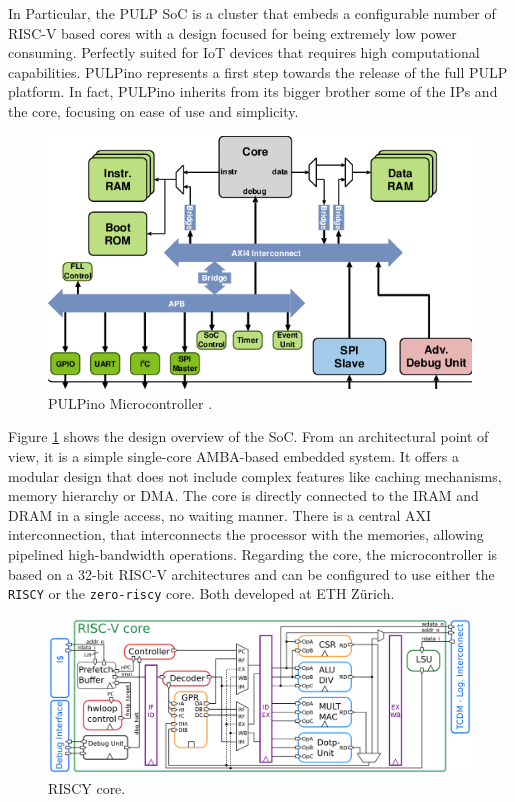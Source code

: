In Particular, the PULP SoC is a cluster that embeds a configurable number of RISC-V based cores with a design focused for being extremely low power consuming. Perfectly suited for IoT devices that requires high computational capabilities. PULPino represents a first step towards the release of the full PULP platform. In fact, PULPino inherits from its bigger brother some of the IPs and the core, focusing on ease of use and simplicity.

\begin{figure}[h!]
\centering
\vspace{0.5cm}
\includegraphics[scale=0.6]{./images/pulpino}
\caption{PULPino Microcontroller \cite{pulpino}.}
\label{fig:pulpino} %
\end{figure}

Figure \ref{fig:pulpino} shows the design overview of the SoC. From an architectural point of view, it is a simple single-core AMBA-based embedded system. It offers a modular design that does not include complex features like caching mechanisms, memory hierarchy or DMA. The core is directly connected to the IRAM and DRAM in a single access, no waiting manner. There is a central AXI interconnection, that interconnects the processor with the memories, allowing pipelined high-bandwidth operations. Regarding the core, the microcontroller is based on a 32-bit RISC-V architectures and can be configured to use either the \texttt{RISCY} or the \texttt{zero-riscy} core. Both developed at ETH Zürich.

\begin{figure}[h!]
\centering
\vspace{0.5cm}
\includegraphics[scale=0.7]{./images/riscy}
\caption{RISCY core.}
\label{fig:riscy} %
\end{figure}

